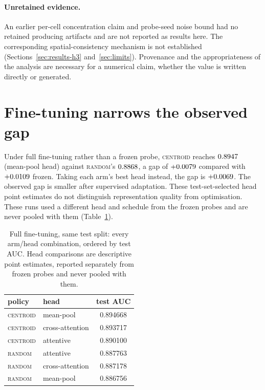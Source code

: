 \documentclass{article}
\newcommand{\ArmBest}{\textsc{centroid}}
\begin{document}
\paragraph{Unretained evidence.}
An earlier per-cell concentration claim and probe-seed noise bound had no
retained producing artifacts and are not reported as results here.
The corresponding spatial-consistency mechanism is not established
(Sections~\ref{sec:results-h3} and~\ref{sec:limits}). Provenance and the
appropriateness of the analysis are necessary for a numerical claim, whether
the value is written directly or generated.

\section{Fine-tuning narrows the observed gap}

Under full fine-tuning rather than a frozen probe, \ArmBest{} reaches
$0.8947$ (mean-pool head) against \textsc{random}'s
$0.8868$, a gap of $+0.0079$ compared with $+0.0109$
frozen. Taking each arm's best head instead, the gap is $+0.0069$. The
observed gap is smaller after supervised adaptation. These test-set-selected
head point estimates do not distinguish representation quality from optimisation.
These runs used a different
head and schedule from the frozen probes and are never pooled with them
(Table~\ref{tab:finetuned}).

\begin{table}[h]
\centering
\caption{Full fine-tuning, same test split: every arm/head combination, ordered
by test AUC. Head comparisons are descriptive point estimates, reported
separately from frozen probes and never pooled with them.}
\label{tab:finetuned}
\small
\begin{tabular}{llc}
\toprule
policy & head & test AUC \\
\midrule
\ArmBest{} & mean-pool & 0.894668 \\
\ArmBest{} & cross-attention & 0.893717 \\
\ArmBest{} & attentive & 0.890100 \\
\textsc{random} & attentive & 0.887763 \\
\textsc{random} & cross-attention & 0.887178 \\
\textsc{random} & mean-pool & 0.886756 \\
\bottomrule
\end{tabular}
\end{table}
\end{document}
